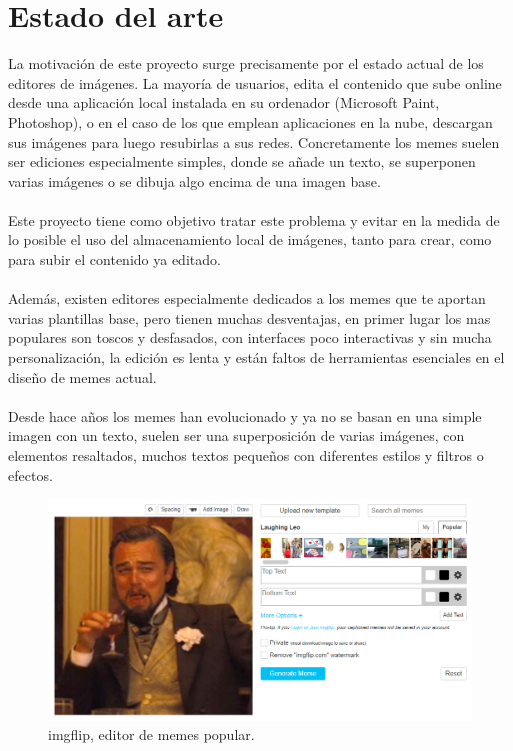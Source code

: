 \chapter{Estado del arte}

La motivación de este proyecto surge precisamente por el estado actual de los editores de imágenes. 
La mayoría de usuarios, edita el contenido que sube online desde una aplicación local instalada en 
su ordenador (Microsoft Paint, Photoshop), o en el caso de los que emplean aplicaciones en la nube, 
descargan sus imágenes para luego resubirlas a sus redes.
Concretamente los memes suelen ser ediciones especialmente simples, donde se añade un texto, 
se superponen varias imágenes o se dibuja algo encima de una imagen base.
\\\\
Este proyecto tiene como objetivo tratar este problema y evitar en la medida de lo posible el uso 
del almacenamiento local de imágenes, tanto para crear, como para subir el contenido ya editado. 
\\\\
Además, existen editores especialmente dedicados a los memes que te aportan varias plantillas
base, pero tienen muchas desventajas, en primer lugar los mas populares son toscos y desfasados,
con interfaces poco interactivas y sin mucha personalización, la edición es lenta y están faltos
de herramientas esenciales en el diseño de memes actual. 
\\\\
Desde hace años los memes han 
evolucionado y ya no se basan en una simple imagen con un texto, suelen ser una superposición
de varias imágenes, con elementos resaltados, muchos textos pequeños con diferentes estilos
y filtros o efectos.

\begin{figure}[!h]
\centering
    \includegraphics[scale=0.4]{img/imgflip.png}
\caption{imgflip, editor de memes popular.}
\end{figure}